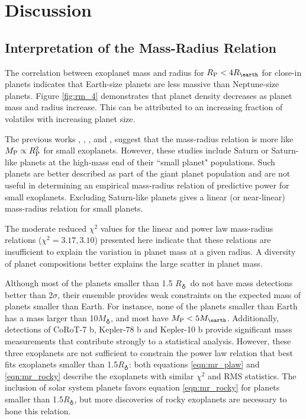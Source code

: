 \documentclass[iop]{emulateapj}
\newcommand{\rpl}{\ensuremath{R_{\rm P}}}
\newcommand{\mpl}{\ensuremath{M_{\rm P}}}
\newcommand{\rearth}{\ensuremath{R_\earth}}
\newcommand{\mearth}{\ensuremath{M_\earth}}
\begin{document}

\section{Discussion}
	
\subsection{Interpretation of the Mass-Radius Relation}
The correlation between exoplanet mass and radius for $\rpl < 4 \rearth$ for close-in planets indicates that Earth-size planets are less massive than Neptune-size planets.  Figure \ref{fig:rm_4} demonstrates that planet density decreases as planet mass and radius increase.  This can be attributed to an increasing fraction of volatiles with increasing planet size.

The previous works \citet{Lissauer2011}, \citet{Enoch2012}, \citet{Kane2012}, and \citet{Weiss2013}, suggest that the mass-radius relation is more like $\mpl \propto \rpl^2$ for small exoplanets.  However, these studies include Saturn or Saturn-like planets at the high-mass end of their ``small planet" populations.  Such planets are better described as part of the giant planet population and are not useful in determining an empirical mass-radius relation of predictive power for small exoplanets.  Excluding Saturn-like planets gives a linear (or near-linear) mass-radius relation for small planets.

The moderate reduced $\chi^2$ values for the linear and power law mass-radius relations ($\chi^2 = 3.17, 3.10$) presented here indicate that these relations are insufficient to explain the variation in planet mass at a given radius.  A diversity of planet compositions better explains the large scatter in planet mass.

Although most of the planets smaller than 1.5 \rearth\ do not have mass detections better than 2$\sigma$, their ensemble provides weak constraints on the expected mass of planets smaller than Earth.  For instance, none of the planets smaller than Earth has a mass larger than 10\mearth, and most have $\mpl < 5\mearth$.  Additionally, detections of CoRoT-7 b, Kepler-78 b and Kepler-10 b provide significant mass measurements that contribute strongly to a statistical analysis.  However, these three exoplanets are not sufficient to constrain the power law relation that best fits exoplanets smaller than 1.5\rearth: both equations \ref{eqn:mr_plaw} and \ref{eqn:mr_rocky} describe the exoplanets with similar $\chi^2$ and RMS statistics.  The inclusion of solar system planets favors equation \ref{eqn:mr_rocky} for planets smaller than 1.5\rearth, but more discoveries of rocky exoplanets are necessary to hone this relation.
\end{document}
